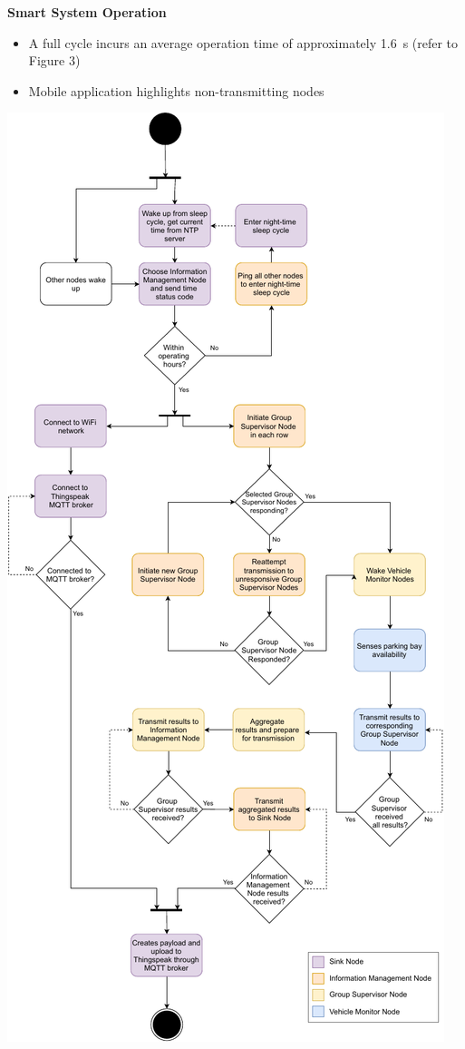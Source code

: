 \documentclass[landscape,a1paper,fontscale=0.47]{baposter} %
\newcommand{\compresslist}{ %
\setlength{\itemsep}{1pt}
\setlength{\parskip}{0pt}
\setlength{\parsep}{0pt}
}
\begin{document}
\begin{poster}
{\begin{multicols}{2}
		\textbf{Smart System Operation}
			\begin{itemize}[leftmargin=13pt]\compresslist
				\item A full cycle incurs an average operation time of approximately 1.6~s (refer to Figure 3)
				\item Mobile application highlights non-transmitting nodes
			\end{itemize}
		
		\vspace{0.5pt}
		
		\begin{center}
			\includegraphics[width=0.9\columnwidth]{flowDiagramBIG-cropped}
		\end{center}
	

\end{multicols}}
\end{poster}
\end{document}
